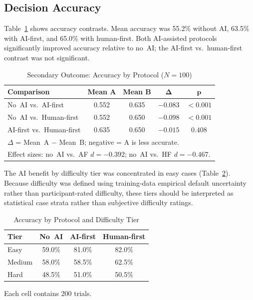 \documentclass[conference]{IEEEtran}
\begin{document}
\subsection{Decision Accuracy}

Table~\ref{tab:accuracy} shows accuracy contrasts. Mean accuracy was
55.2\% without AI, 63.5\% with AI-first, and 65.0\% with human-first.
Both AI-assisted protocols significantly improved accuracy relative to
no~AI; the AI-first vs.\ human-first contrast was not significant.

\begin{table}[H]
  \centering
  \caption{Secondary Outcome: Accuracy by Protocol ($N=100$)}
  \label{tab:accuracy}
  \begin{tabular}{lcccc}
    \toprule
    \textbf{Comparison} & \textbf{Mean A} & \textbf{Mean B}
      & $\boldsymbol{\Delta}$ & $\boldsymbol{p}$ \\
    \midrule
    No~AI vs.\ AI-first        & 0.552 & 0.635 & $-0.083$ & $<0.001$    \\
    No~AI vs.\ Human-first     & 0.552 & 0.650 & $-0.098$ & $<0.001$    \\
    AI-first vs.\ Human-first  & 0.635 & 0.650 & $-0.015$ & $0.408$     \\
    \bottomrule
    \multicolumn{5}{l}{\footnotesize $\Delta$ = Mean~A $-$ Mean~B; negative = A is less accurate.}\\
    \multicolumn{5}{l}{\footnotesize Effect sizes: no~AI vs.\ AF $d=-0.392$; no~AI vs.\ HF $d=-0.467$.}
  \end{tabular}
\end{table}

The AI benefit by difficulty tier was concentrated in easy cases
(Table~\ref{tab:diff}). Because difficulty was defined using
training-data empirical default uncertainty rather than participant-rated
difficulty, these tiers should be interpreted as statistical case strata
rather than subjective difficulty ratings.

\begin{table}[H]
  \centering
  \caption{Accuracy by Protocol and Difficulty Tier}
  \label{tab:diff}
  \scriptsize
  \setlength{\tabcolsep}{3.2pt}
  \begin{tabular}{@{}lccc@{}}
    \toprule
    \textbf{Tier} & \textbf{No~AI} & \textbf{AI-first}
      & \textbf{Human-first} \\
    \midrule
    Easy   & 59.0\% & 81.0\% & 82.0\% \\
    Medium & 58.0\% & 58.5\% & 62.5\% \\
    Hard   & 48.5\% & 51.0\% & 50.5\% \\
    \bottomrule
  \end{tabular}

  \vspace{1pt}
  \parbox{0.82\columnwidth}{\scriptsize
    Each cell contains 200 trials.
  }
\end{table}
\end{document}
